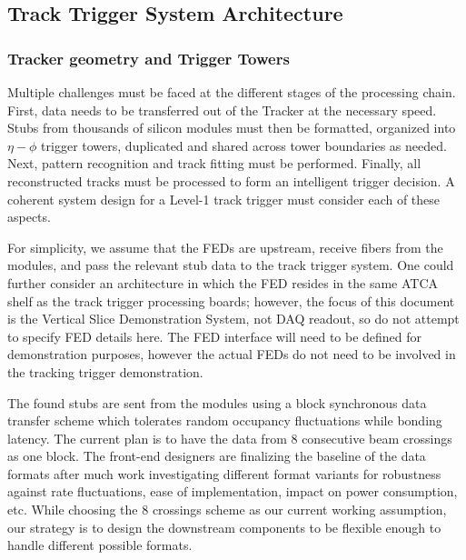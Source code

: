 \subsection{Track Trigger System Architecture}


\subsubsection{Tracker geometry and Trigger Towers }

\noindent 

Multiple challenges must be faced at the different stages of the processing chain.  First, data needs to be transferred out of the Tracker at the necessary speed.  Stubs from thousands of silicon modules must then be formatted, organized into $\eta-\phi$ trigger towers, duplicated and shared across tower boundaries as needed.  Next, pattern recognition and track fitting must be performed.  Finally, all reconstructed  tracks must be processed to form an intelligent trigger decision. A coherent system design for a Level-1 track trigger must consider each of these aspects.

For simplicity, we assume that the FEDs are upstream, receive fibers from the modules, and pass the relevant stub data to the track trigger system.  One could further consider an architecture in which the FED resides in the same ATCA shelf as the track trigger processing boards; however, the focus of this document is the Vertical Slice Demonstration System, not DAQ readout, so do not attempt to specify FED details here.
The FED interface will need to be defined for demonstration purposes, however the actual FEDs do not need to be involved in the tracking trigger demonstration.


\noindent The found stubs are sent from the modules using a block synchronous data transfer scheme which tolerates random occupancy fluctuations while bonding latency. The current plan is to have the data from 8 consecutive beam crossings as one block. The front-end designers are finalizing the baseline of the data formats after much work investigating different format variants for robustness against rate fluctuations, ease of implementation, impact on power consumption, etc. While choosing the 8 crossings scheme as our current working assumption, our strategy is to design the downstream components to be flexible enough to handle different possible formats. 


